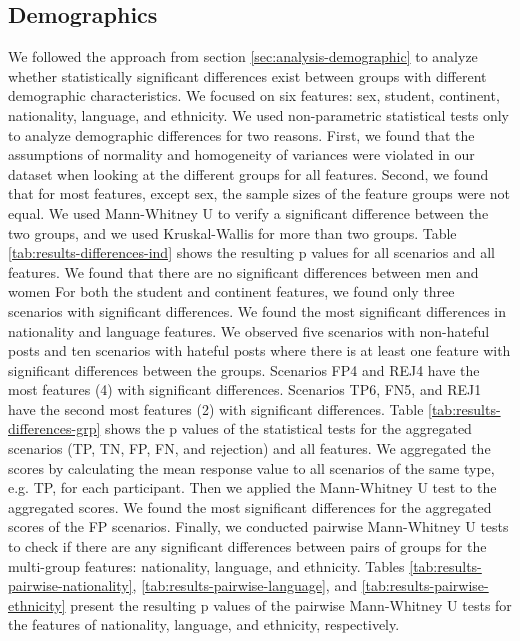 \subsection{Demographics}
\label{sec:results-demographics}
We followed the approach from section \ref{sec:analysis-demographic} to analyze whether statistically significant differences exist between groups with different demographic characteristics.
%
We focused on six features: sex, student, continent, nationality, language, and ethnicity.
%
We used non-parametric statistical tests only to analyze demographic differences for two reasons.
%
First, we found that the assumptions of normality and homogeneity of variances were violated in our dataset when looking at the different groups for all features.
%
Second, we found that for most features, except sex, the sample sizes of the feature groups were not equal.
%
We used Mann-Whitney U to verify a significant difference between the two groups, and we used Kruskal-Wallis for more than two groups.
%
Table \ref{tab:results-differences-ind} shows the resulting p values for all scenarios and all features.
%
We found that there are no significant differences between men and women
%
For both the student and continent features, we found only three scenarios with significant differences.
%
We found the most significant differences in nationality and language features.
%
We observed five scenarios with non-hateful posts and ten scenarios with hateful posts where there is at least one feature with significant differences between the groups.
%
Scenarios FP4 and REJ4 have the most features (4) with significant differences.
%
Scenarios TP6, FN5, and REJ1 have the second most features (2) with significant differences.
%
Table \ref{tab:results-differences-grp} shows the p values of the statistical tests for the aggregated scenarios (TP, TN, FP, FN, and rejection) and all features.
%
We aggregated the scores by calculating the mean response value to all scenarios of the same type, e.g. TP, for each participant.
%
Then we applied the Mann-Whitney U test to the aggregated scores.
%
We found the most significant differences for the aggregated scores of the FP scenarios.
%
Finally, we conducted pairwise Mann-Whitney U tests to check if there are any significant differences between pairs of groups for the multi-group features: nationality, language, and ethnicity.
%
Tables \ref{tab:results-pairwise-nationality}, \ref{tab:results-pairwise-language}, and \ref{tab:results-pairwise-ethnicity} present the resulting p values of the pairwise Mann-Whitney U tests for the features of nationality, language, and ethnicity, respectively.
